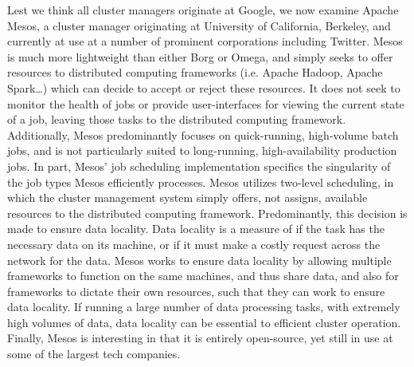 Lest we think all cluster managers originate at Google, we now examine Apache
Mesos, a cluster manager originating at University of California, Berkeley, and
currently at use at a number of prominent corporations including Twitter. Mesos
is much more lightweight than either Borg or Omega, and simply seeks to offer
resources to distributed computing frameworks (i.e. Apache Hadoop, Apache
Spark\dots) which can decide to accept or reject these resources. It does not
seek to monitor the health of jobs or provide user-interfaces for viewing the
current state of a job, leaving those tasks to the distributed computing
framework. Additionally, Mesos predominantly focuses on quick-running,
high-volume batch jobs, and is not particularly suited to long-running,
high-availability production jobs.\cite[pg. 358]{omega} In part, Mesos'
job scheduling implementation specifics the singularity of the job types
Mesos efficiently processes. Mesos utilizes two-level scheduling, in which the
cluster management system simply offers, not assigns, available
resources to the distributed computing framework. Predominantly, this decision
is made to ensure data locality.\cite[pg. 1]{mesos} Data locality is a measure
of if the task has the necessary data on its machine, or if it must make a
costly request across the network for the data. Mesos works to ensure data
locality by allowing multiple frameworks to function on the same machines, and
thus share data, and also for frameworks to dictate their own resources, such
that they can work to ensure data locality. If running a large number of data
processing tasks, with extremely high volumes of data, data locality can be
essential to efficient cluster operation. Finally, Mesos is interesting in
that it is entirely open-source, yet still in use at some of the largest tech
companies.
